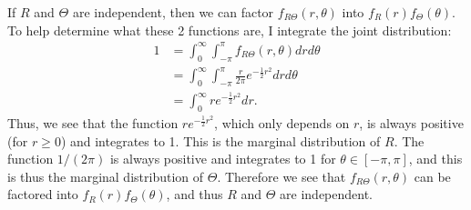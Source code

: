 \begin{problem}{29}
If $R$ and $\Theta$ are independent, then we can factor $f_{R\Theta}(r, \theta)$ into $f_{R}(r)f_\Theta(\theta)$.  To help determine what these 2 functions are, I integrate the joint distribution:
\begin{align*}
1 &=\int_0^\infty \int_{-\pi}^\pi f_{R\Theta}(r, \theta) dr d \theta \\
& =\int_0^\infty \int_{-\pi}^\pi \frac{r}{2 \pi} e^{-\frac{1}{2}r^2}dr d \theta \\
& = \int_0^\infty r e^{-\frac{1}{2}r^2}dr.
\end{align*}
Thus, we see that the function $r e^{-\frac{1}{2}r^2}$, which only depends on $r$, is always positive (for $r \ge 0$) and integrates to 1.  This is the marginal distribution of $R$.  The function $1/(2 \pi)$ is always positive and integrates to 1 for $\theta \in [-\pi, \pi]$, and this is thus the marginal distribution of $\Theta$.  Therefore we see that $f_{R\Theta}(r, \theta)$ can be factored into $f_{R}(r)f_\Theta(\theta)$, and thus $R$ and $\Theta$ are independent.



\end{problem}

